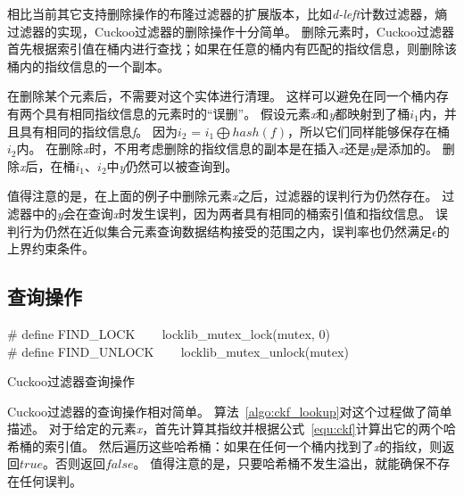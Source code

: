 相比当前其它支持删除操作的布隆过滤器的扩展版本，比如\textit{d-left}计数过滤器，熵过滤器的实现，Cuckoo过滤器的删除操作十分简单。
删除元素时，Cuckoo过滤器首先根据索引值在桶内进行查找；如果在任意的桶内有匹配的指纹信息，则删除该桶内的指纹信息的一个副本。

在删除某个元素后，不需要对这个实体进行清理。
这样可以避免在同一个桶内存有两个具有相同指纹信息的元素时的“误删”。
假设元素\textit{x}和\textit{y}都映射到了桶$i_1$内，并且具有相同的指纹信息\textit{f}。
因为$i_2$ = $i_1\bigoplus hash(f)$，所以它们同样能够保存在桶$i_2$内。
在删除\textit{x}时，不用考虑删除的指纹信息的副本是在插入\textit{x}还是\textit{y}是添加的。
删除\textit{x}后，在桶$i_1$、$i_2$中\textit{y}仍然可以被查询到。

值得注意的是，在上面的例子中删除元素\textit{x}之后，过滤器的误判行为仍然存在。
过滤器中的\textit{y}会在查询\textit{x}时发生误判，因为两者具有相同的桶索引值和指纹信息。
误判行为仍然在近似集合元素查询数据结构接受的范围之内，误判率也仍然满足$\epsilon$的上界约束条件。

\subsection{查询操作}

\begin{algorithm}[htbp]
\SetAlgoLined
\# define FIND\_LOCK ~~~ locklib\_mutex\_lock(mutex, 0)\\
\# define FIND\_UNLOCK ~~~ locklib\_mutex\_unlock(mutex)\\
\caption{Cuckoo过滤器查询操作}
\label{algo:ckf_lookup}
\end{algorithm}

Cuckoo过滤器的查询操作相对简单。
算法~\ref{algo:ckf_lookup}对这个过程做了简单描述。
对于给定的元素\textit{x}，首先计算其指纹并根据公式~\ref{equ:ckf}计算出它的两个哈希桶的索引值。
然后遍历这些哈希桶：如果在任何一个桶内找到了\textit{x}的指纹，则返回$true$。否则返回$false$。
值得注意的是，只要哈希桶不发生溢出，就能确保不存在任何误判。

